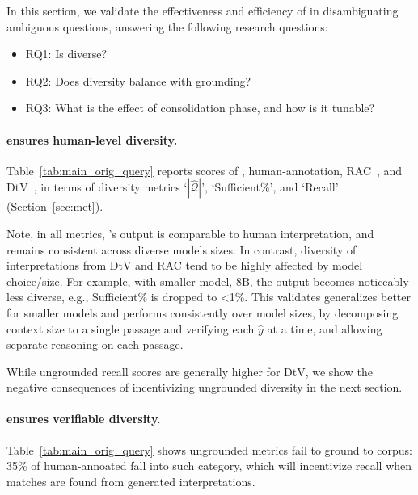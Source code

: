 In this section, we validate the effectiveness and efficiency of \ours in disambiguating ambiguous questions, answering the following research questions:
\begin{itemize}
\item RQ1: Is \ours diverse?
\item RQ2: Does diversity balance with grounding?

\item RQ3: What is the effect of consolidation phase, and how is it tunable?
\end{itemize}




\paragraph{\ours ensures human-level diversity.}
Table~\ref{tab:main_orig_query} reports
scores of \ours, human-annotation, RAC~\citep{kim-etal-2023-tree}, and DtV~\citep{in-etal-2024-diversify-arxiv},
in terms of diversity metrics
`$|\hat{\mathcal{Q}}|$',
`Sufficient\%',
and `Recall' (Section~\ref{sec:met}).

Note, in all metrics,
\ours's output is comparable to human interpretation, and remains consistent across diverse models sizes.
In contrast, diversity of interpretations from DtV and RAC tend to be highly affected by model choice/size.
For example, with smaller model, 8B, the output becomes noticeably less diverse, e.g., Sufficient\% is dropped to <1\%.
This validates \ours generalizes better for smaller models and performs consistently over model sizes, by
decomposing context size to a single passage and verifying each $\hat{y}$ at a time, and allowing separate reasoning on each passage.
 

While ungrounded recall scores are generally higher for DtV, 
we show the negative consequences of  
incentivizing ungrounded diversity in the next section.
 

\paragraph{\ours ensures verifiable diversity.}



Table~\ref{tab:main_orig_query} shows ungrounded metrics fail to ground to corpus:
35\% of human-annoated 
fall into such category, 
which will incentivize recall when matches are found from generated interpretations.



